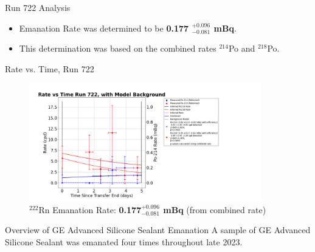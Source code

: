 \documentclass[aspectratio=169]{beamer}
\begin{document}
\begin{frame}{Run 722 Analysis}
    \begin{itemize}
        \item Emanation Rate was determined to be \textbf{0.177 $^{+0.096}_{-0.081}$ mBq}.
        \item This determination was based on the combined rates $^{214}$Po and $^{218}$Po.
    \end{itemize}

    \hyperlink{722_Backup}{}
\end{frame}

\begin{frame}{Rate vs. Time, Run 722}
\label{RvT_722}
    \begin{figure}
        \begin{center}
            \includegraphics[width=0.9\textwidth]
            {assets/722/RvT.png}
            \caption{$^{222}$Rn Emanation Rate: 
            \textbf{0.177$^{+0.096}_{-0.081}$ mBq} (from combined rate)}
        \end{center}
    \end{figure}    
\end{frame}

\begin{frame}{Overview of GE Advanced Silicone Sealant Emanation}
    A sample of GE Advanced Silicone Sealant was emanated four times throughout late 2023.

\end{frame}
\end{document}
